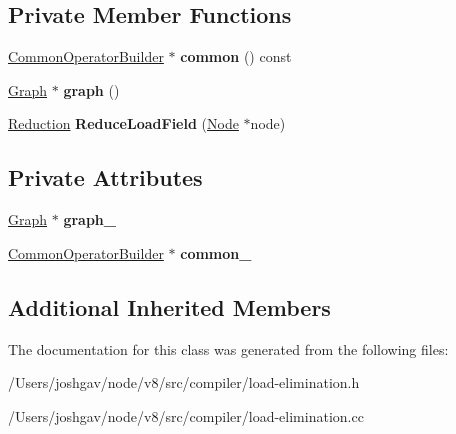 \subsection*{Private Member Functions}
\begin{DoxyCompactItemize}
\item 
\hyperlink{classv8_1_1internal_1_1compiler_1_1_common_operator_builder}{Common\+Operator\+Builder} $\ast$ {\bfseries common} () const \hypertarget{classv8_1_1internal_1_1compiler_1_1_load_elimination_a5f5d396767a0e354df2c8632ad87dbf0}{}\label{classv8_1_1internal_1_1compiler_1_1_load_elimination_a5f5d396767a0e354df2c8632ad87dbf0}

\item 
\hyperlink{classv8_1_1internal_1_1compiler_1_1_graph}{Graph} $\ast$ {\bfseries graph} ()\hypertarget{classv8_1_1internal_1_1compiler_1_1_load_elimination_a9a8588b486a4d6fd9eb88f196667f202}{}\label{classv8_1_1internal_1_1compiler_1_1_load_elimination_a9a8588b486a4d6fd9eb88f196667f202}

\item 
\hyperlink{classv8_1_1internal_1_1compiler_1_1_reduction}{Reduction} {\bfseries Reduce\+Load\+Field} (\hyperlink{classv8_1_1internal_1_1compiler_1_1_node}{Node} $\ast$node)\hypertarget{classv8_1_1internal_1_1compiler_1_1_load_elimination_a9f4484ddc020cf4c476ef0463fe87fda}{}\label{classv8_1_1internal_1_1compiler_1_1_load_elimination_a9f4484ddc020cf4c476ef0463fe87fda}

\end{DoxyCompactItemize}
\subsection*{Private Attributes}
\begin{DoxyCompactItemize}
\item 
\hyperlink{classv8_1_1internal_1_1compiler_1_1_graph}{Graph} $\ast$ {\bfseries graph\+\_\+}\hypertarget{classv8_1_1internal_1_1compiler_1_1_load_elimination_afa779edf55f6a004c57a5e62d8923746}{}\label{classv8_1_1internal_1_1compiler_1_1_load_elimination_afa779edf55f6a004c57a5e62d8923746}

\item 
\hyperlink{classv8_1_1internal_1_1compiler_1_1_common_operator_builder}{Common\+Operator\+Builder} $\ast$ {\bfseries common\+\_\+}\hypertarget{classv8_1_1internal_1_1compiler_1_1_load_elimination_a16995713cdf1e5a56fcea963e60d3ae1}{}\label{classv8_1_1internal_1_1compiler_1_1_load_elimination_a16995713cdf1e5a56fcea963e60d3ae1}

\end{DoxyCompactItemize}
\subsection*{Additional Inherited Members}


The documentation for this class was generated from the following files\+:\begin{DoxyCompactItemize}
\item 
/\+Users/joshgav/node/v8/src/compiler/load-\/elimination.\+h\item 
/\+Users/joshgav/node/v8/src/compiler/load-\/elimination.\+cc\end{DoxyCompactItemize}
